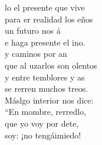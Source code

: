 \begin{cancion}
	lo el presente que vive \\
	para er realidad los eños\\
	un futuro nos á \\
	e haga presente el ino.  \\
	\jump
	y caminos por an \\
	que al uzarlos son olentos\\
	y entre temblores y as \\
	se rerren muchos treos.  \\
	Máslgo interior nos dice: \\
	“En mombre, rerredlo,\\
	que yo voy por dete, \\
	 soy: ¡no tengáimiedo! \\
\end{cancion}%
